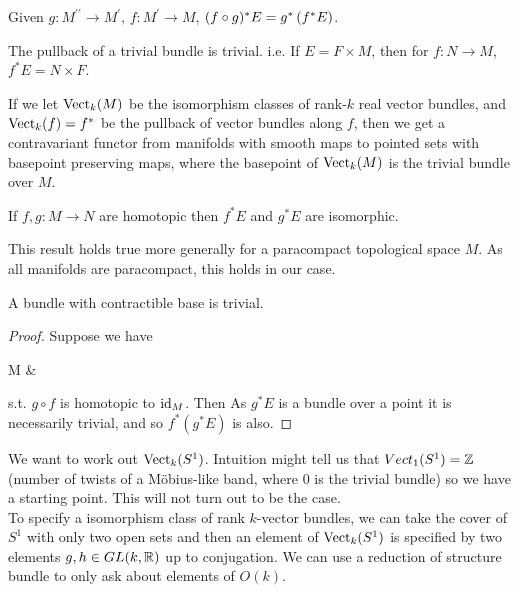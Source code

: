\documentclass{article}
\begin{document}
\begin{lemma}
	Given $g:M^{\prime\prime}\to M^{\prime}, \, f:M^\prime \to M$, $(f \circ g)^{\ast}E = g^{\ast}\left( f^{\ast}E \right)$.
\end{lemma}

\begin{lemma}
	The pullback of a trivial bundle is trivial. i.e. If $E =F \times M$, then for $f:N \to M$, $f^{\ast}E = N \times F$.
\end{lemma}

\begin{remark}
	If we let $\operatorname{Vect}_k(M)$ be the isomorphism classes of rank-$k$ real vector bundles, and $\operatorname{Vect}_k(f) = f^{\ast}$ be the pullback of vector bundles along $f$, then we get a contravariant functor from manifolds with smooth maps to pointed sets with basepoint preserving maps, where the basepoint of $\operatorname{Vect}_k(M)$ is the trivial bundle over $M$.
\end{remark}

\begin{prop}
	If $f,g : M \to N$ are homotopic then $f^{\ast}E$ and $g^{\ast}E$ are isomorphic.
\end{prop}
\begin{remark}
	This result holds true more generally for a  paracompact topological space $M$. As all manifolds are paracompact, this holds in our case.
\end{remark}
\begin{corollary}
	A bundle with contractible base is trivial.
\end{corollary}
\begin{proof}
	Suppose we have 
	\begin{tkz}
		M  & \ast {}
	\end{tkz}
	s.t. $g \circ f$ is homotopic to $\operatorname{id}_M$. Then 
	As $g^{\ast}E$ is a bundle over a point it is necessarily trivial, and so $f^{\ast}(g^{\ast}E)$ is also.
\end{proof}

\begin{example}
	We want to work out $\operatorname{Vect}_k(S^1)$. Intuition might tell us that $Vect_1(S^1) = \mathbb{Z}$ (number of twists of a M\"obius-like band, where 0 is the trivial bundle) so we have a starting point. This will not turn out to be the case. \\
	To specify a isomorphism class of rank $k$-vector bundles, we can take the cover of $S^1$ with only two open sets and then an element of $\operatorname{Vect}_k(S^1)$ is specified by two elements $g,h \in GL(k,\mathbb{R})$ up to conjugation. We can use a reduction of structure bundle to only ask about elements of $O(k)$. 
\end{example}
\end{document}

